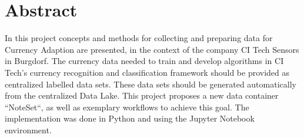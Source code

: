 \chapter*{Abstract}
\label{chap:abstract}

In this project concepts and methods for collecting and preparing data for Currency Adaption are presented, in the context of the company CI Tech Sensors in Burgdorf.
The currency data needed to train and develop algorithms in CI Tech's currency recognition and classification framework should be provided as centralized labelled data sets. These data sets should be generated automatically from the centralized Data Lake. This project proposes a new data container ``NoteSet``, as well as exemplary workflows to achieve this goal.
The implementation was done in Python and using the Jupyter Notebook environment.